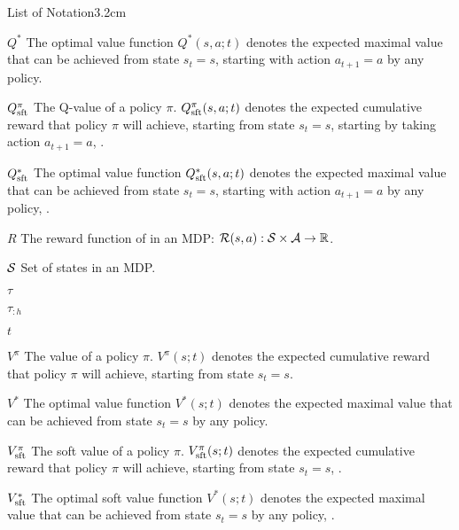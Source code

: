 \begin{mclistof}{List of Notation}{3.2cm}
    \item[$Q^*$]
        The optimal value function $Q^*(s,a;t)$ denotes the expected maximal value that can be achieved from state $s_t=s$, starting with action $a_{t+1}=a$ by any policy.
    \item[$Q_{{\textnormal{sft}}}^{\pi}$]
        The Q-value of a policy $\pi$. $Q_{{\textnormal{sft}}}^{\pi}(s,a;t)$ denotes the expected cumulative reward that policy $\pi$ will achieve, starting from state $s_t=s$, starting by taking action $a_{t+1}=a$, . 
    \item[$Q_{{\textnormal{sft}}}^*$]
        The optimal value function $Q_{{\textnormal{sft}}}^*(s,a;t)$ denotes the expected maximal value that can be achieved from state $s_t=s$, starting with action $a_{t+1}=a$ by any policy, .
    \item[$R$] 
        The reward function of in an MDP: $\mathcal{R}(s,a) : \mathcal{S}\times \mathcal{A}\rightarrow \mathbb{R}$.
    \item[$\mathcal{S}$] 
        Set of states in an MDP. 
    \item[$\tau$] 
    \item[$\tau_{:h}$] 
    \item[$t$] 
    \item[$V^{\pi}$]
        The value of a policy $\pi$. $V^{\pi}(s;t)$ denotes the expected cumulative reward that policy $\pi$ will achieve, starting from state $s_t=s$.
    \item[$V^*$]
        The optimal value function $V^*(s;t)$ denotes the expected maximal value that can be achieved from state $s_t=s$ by any policy.
    \item[$V_{{\textnormal{sft}}}^{\pi}$]
        The soft value of a policy $\pi$. $V_{{\textnormal{sft}}}^{\pi}(s;t)$ denotes the expected cumulative reward that policy $\pi$ will achieve, starting from state $s_t=s$, .
    \item[$V_{{\textnormal{sft}}}^*$]
        The optimal soft value function $V^*(s;t)$ denotes the expected maximal value that can be achieved from state $s_t=s$ by any policy, .


\end{mclistof}
